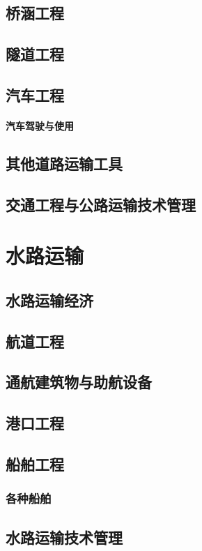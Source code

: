 \documentclass[UTF8]{../ApplicationUniverse}
\begin{document}
\section{桥涵工程}
\section{隧道工程}
\section{汽车工程}
    \subsubsection{汽车驾驶与使用}
\section{其他道路运输工具}
\section{交通工程与公路运输技术管理}


\chapter{水路运输}
\section{水路运输经济}
\section{航道工程}
\section{通航建筑物与助航设备}
\section{港口工程}
\section{船舶工程}
    \subsection{各种船舶}
\section{水路运输技术管理}
\end{document}
